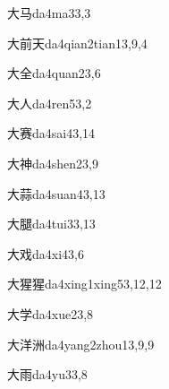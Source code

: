 \begin{entry}{大马}{da4ma3}{3,3}
\end{entry}

\begin{entry}{大前天}{da4qian2tian1}{3,9,4}
\end{entry}

\begin{entry}{大全}{da4quan2}{3,6}
\end{entry}

\begin{entry}{大人}{da4ren5}{3,2}
\end{entry}

\begin{entry}{大赛}{da4sai4}{3,14}
\end{entry}

\begin{entry}{大神}{da4shen2}{3,9}
\end{entry}

\begin{entry}{大蒜}{da4suan4}{3,13}
\end{entry}

\begin{entry}{大腿}{da4tui3}{3,13}
\end{entry}

\begin{entry}{大戏}{da4xi4}{3,6}
\end{entry}

\begin{entry}{大猩猩}{da4xing1xing5}{3,12,12}
\end{entry}

\begin{entry}{大学}{da4xue2}{3,8}
\end{entry}

\begin{entry}{大洋洲}{da4yang2zhou1}{3,9,9}
\end{entry}

\begin{entry}{大雨}{da4yu3}{3,8}
\end{entry}

